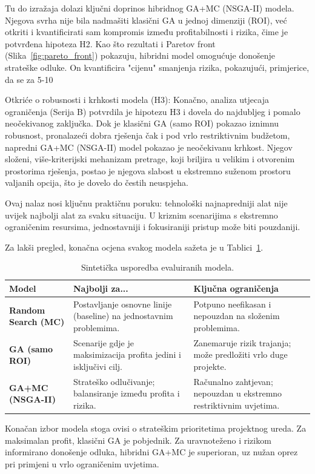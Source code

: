 Tu do izražaja dolazi ključni doprinos hibridnog GA+MC (NSGA-II) modela. Njegova svrha nije bila nadmašiti klasični GA u jednoj dimenziji (ROI), već otkriti i kvantificirati sam kompromis između profitabilnosti i rizika, čime je potvrđena hipoteza H2. Kao što rezultati i Paretov front (Slika~\ref{fig:pareto_front}) pokazuju, hibridni model omogućuje donošenje strateške odluke. On kvantificira "cijenu" smanjenja rizika, pokazujući, primjerice, da se za 5-10%

Otkriće o robusnosti i krhkosti modela (H3):
Konačno, analiza utjecaja ograničenja (Serija B) potvrdila je hipotezu H3 i dovela do najdubljeg i pomalo neočekivanog zaključka. Dok je klasični GA (samo ROI) pokazao iznimnu robusnost, pronalazeći dobra rješenja čak i pod vrlo restriktivnim budžetom, napredni GA+MC (NSGA-II) model pokazao je neočekivanu krhkost. Njegov složeni, više-kriterijski mehanizam pretrage, koji briljira u velikim i otvorenim prostorima rješenja, postao je njegova slabost u ekstremno suženom prostoru valjanih opcija, što je dovelo do čestih neuspjeha.

Ovaj nalaz nosi ključnu praktičnu poruku: tehnološki najnapredniji alat nije uvijek najbolji alat za svaku situaciju. U kriznim scenarijima s ekstremno ograničenim resursima, jednostavniji i fokusiraniji pristup može biti pouzdaniji.

Za lakši pregled, konačna ocjena svakog modela sažeta je u Tablici~\ref{tab:sinteza_modela}.

\begin{table}[H]
\centering
\caption{Sintetička usporedba evaluiranih modela.}
\label{tab:sinteza_modela}
\begin{tabular}{|l|p{4cm}|p{4cm}|}
\hline
\textbf{Model} & \textbf{Najbolji za...} & \textbf{Ključna ograničenja} \\
\hline
\textbf{Random Search (MC)} & Postavljanje osnovne linije (baseline) na jednostavnim problemima. & Potpuno neefikasan i nepouzdan na složenim problemima. \\
\hline
\textbf{GA (samo ROI)} & Scenarije gdje je maksimizacija profita jedini i isključivi cilj. & Zanemaruje rizik trajanja; može predložiti vrlo duge projekte. \\
\hline
\textbf{GA+MC (NSGA-II)} & Strateško odlučivanje; balansiranje između profita i rizika. & Računalno zahtjevan; nepouzdan u ekstremno restriktivnim uvjetima. \\
\hline
\end{tabular}
\end{table}


Konačan izbor modela stoga ovisi o strateškim prioritetima projektnog ureda. Za maksimalan profit, klasični GA je pobjednik. Za uravnoteženo i rizikom informirano donošenje odluka, hibridni GA+MC je superioran, uz nužan oprez pri primjeni u vrlo ograničenim uvjetima.
